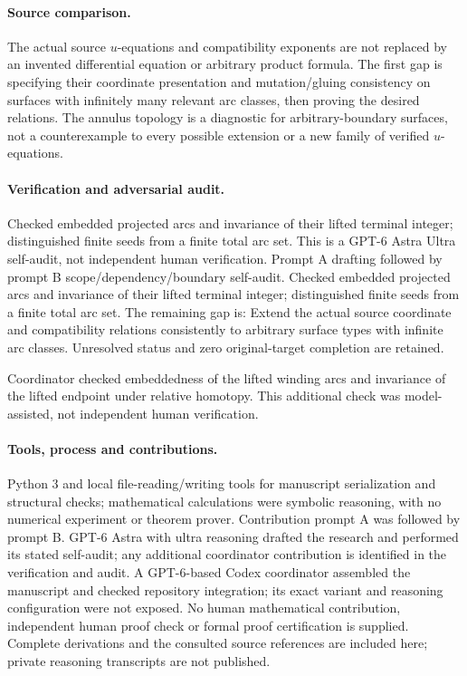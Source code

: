 \documentclass[11pt]{article}
\begin{document}
\paragraph{Source comparison.} The actual source \(u\)-equations and compatibility exponents are not replaced by an invented differential equation or arbitrary product formula. The first gap is specifying their coordinate presentation and mutation/gluing consistency on surfaces with infinitely many relevant arc classes, then proving the desired relations. The annulus topology is a diagnostic for arbitrary-boundary surfaces, not a counterexample to every possible extension or a new family of verified \(u\)-equations.

\paragraph{Verification and adversarial audit.}
Checked embedded projected arcs and invariance of their lifted terminal integer; distinguished finite seeds from a finite total arc set. This is a GPT-6 Astra Ultra self-audit, not independent human verification. Prompt A drafting followed by prompt B scope/dependency/boundary self-audit. Checked embedded projected arcs and invariance of their lifted terminal integer; distinguished finite seeds from a finite total arc set. The remaining gap is: Extend the actual source coordinate and compatibility relations consistently to arbitrary surface types with infinite arc classes. Unresolved status and zero original-target completion are retained.

Coordinator checked embeddedness of the lifted winding arcs and invariance of the lifted endpoint under relative homotopy. This additional check was model-assisted, not independent human verification.

\paragraph{Tools, process and contributions.}
Python 3 and local file-reading/writing tools for manuscript serialization and structural checks; mathematical calculations were symbolic reasoning, with no numerical experiment or theorem prover. Contribution prompt A was followed by prompt B. GPT-6 Astra with ultra reasoning drafted the research and performed its stated self-audit; any additional coordinator contribution is identified in the verification and audit. A GPT-6-based Codex coordinator assembled the manuscript and checked repository integration; its exact variant and reasoning configuration were not exposed. No human mathematical contribution, independent human proof check or formal proof certification is supplied. Complete derivations and the consulted source references are included here; private reasoning transcripts are not published.
\end{document}
